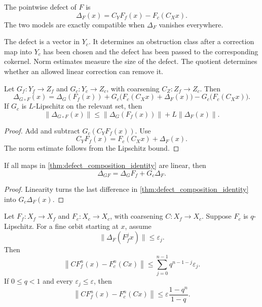 \begin{definition}\label{def:nonlinear_defect}
The pointwise defect of $F$ is
\[
\Delta_F(x)
=
C_YF_f(x)-F_c(C_Xx).
\]
The two models are exactly compatible when $\Delta_F$ vanishes everywhere.
\end{definition}


The defect is a vector in $Y_c$.  It determines an obstruction class after a correction map into $Y_c$ has been chosen and the defect has been passed to the corresponding cokernel.  Norm estimates measure the size of the defect.  The quotient determines whether an allowed linear correction can remove it.

\begin{theorem}\label{thm:defect_composition_identity}
Let $G_f:Y_f\to Z_f$ and $G_c:Y_c\to Z_c$, with coarsening $C_Z:Z_f\to Z_c$.  Then
\[
\Delta_{G\circ F}(x)
=
\Delta_G(F_f(x))
+
G_c\big(F_c(C_Xx)+\Delta_F(x)\big)
-
G_c\big(F_c(C_Xx)\big).
\]
If $G_c$ is $L$-Lipschitz on the relevant set, then
\[
\|\Delta_{G\circ F}(x)\|
\le
\|\Delta_G(F_f(x))\|
+
L\|\Delta_F(x)\|.
\]
\end{theorem}

\begin{proof}
Add and subtract $G_c(C_YF_f(x))$.  Use
\[
C_YF_f(x)=F_c(C_Xx)+\Delta_F(x).
\]
The norm estimate follows from the Lipschitz bound.
\end{proof}

\begin{corollary}\label{cor:linear_defect_product}
If all maps in \cref{thm:defect_composition_identity} are linear, then
\[
\Delta_{GF}
=
\Delta_G F_f+G_c\Delta_F.
\]
\end{corollary}

\begin{proof}
Linearity turns the last difference in \cref{thm:defect_composition_identity} into $G_c\Delta_F(x)$.
\end{proof}

\begin{theorem}\label{thm:iterated_orbit_defect}
Let $F_f:X_f\to X_f$ and $F_c:X_c\to X_c$, with coarsening $C:X_f\to X_c$.  Suppose $F_c$ is $q$-Lipschitz.  For a fine orbit starting at $x$, assume
\[
\|\Delta_F(F_f^j x)\|\le\varepsilon_j.
\]
Then
\[
\left\|CF_f^n(x)-F_c^n(Cx)\right\|
\le
\sum_{j=0}^{n-1}q^{n-1-j}\varepsilon_j.
\]
If $0\le q<1$ and every $\varepsilon_j\le\varepsilon$, then
\[
\left\|CF_f^n(x)-F_c^n(Cx)\right\|
\le
\varepsilon\frac{1-q^n}{1-q}.
\]
\end{theorem}

